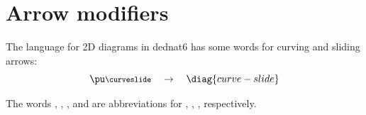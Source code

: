 \documentclass[oneside]{article}
\begin{document}
%                                
\section{Arrow modifiers}


The language for 2D diagrams in dednat6 has some words for curving and
sliding arrows:
%
%
$$\pu
  \myvcenter{\footnotesize\curveslide}
  \quad
  \to
  \quad
  \diag{curve-slide}
$$


The words , , , and  are
abbreviations for , ,
,  respectively.


\end{document}
